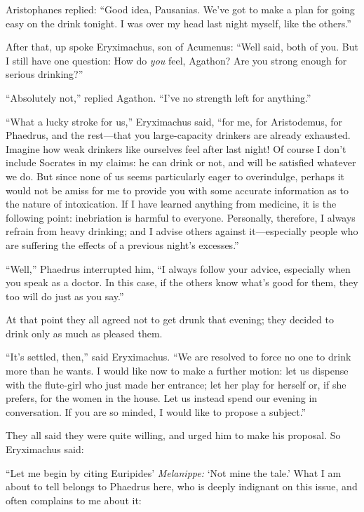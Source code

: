 Aristophanes replied: “Good idea, Pausanias. We’ve got to make a plan
for going easy on the drink tonight. I was over my head last night
myself, like the others.”

After that, up spoke Eryximachus, son of Acumenus: “Well said, both of
you. But I still have one question: How do {\em you} feel, Agathon? Are
you strong enough for serious drinking?”

“Absolutely not,” replied Agathon. “I’ve no strength left for anything.”

“What a lucky stroke for us,” Eryximachus said, “for me, for
Aristodemus, for Phaedrus, and the rest---that you large-capacity
drinkers are already exhausted. Imagine how weak drinkers like ourselves
feel after last night! Of course I don’t include Socrates in my claims:
he can drink or not, and will be satisfied whatever we do. But since
none of us seems particularly eager to overindulge, perhaps it would not
be amiss for me to provide you with some accurate information as
to the nature of intoxication. If I have learned anything from medicine,
it is the following point: inebriation is harmful to everyone.
Personally, therefore, I always refrain from heavy drinking; and I
advise others against it---especially people who are suffering the
effects of a previous night’s excesses.”

“Well,” Phaedrus interrupted him, “I always follow your advice,
especially when you speak as a doctor. In this case, if the others know
what’s good for them, they too will do just as you say.”

At that point they all agreed not to get drunk that evening;
they decided to drink only as much as pleased them.

“It’s settled, then,” said Eryximachus. “We are resolved to force no one
to drink more than he wants. I would like now to make a further motion:
let us dispense with the flute-girl who just made her entrance; let her
play for herself or, if she prefers, for the women in the house. Let us
instead spend our evening in conversation. If you are so minded, I would
like to propose a subject.”

They all said they were quite willing, and urged him to make his
proposal. So Eryximachus said:

“Let me begin by citing Euripides’ {\em Melanippe:} ‘Not mine the tale.’
What I am about to tell belongs to Phaedrus here, who is deeply
indignant on this issue, and often complains to me about it:

